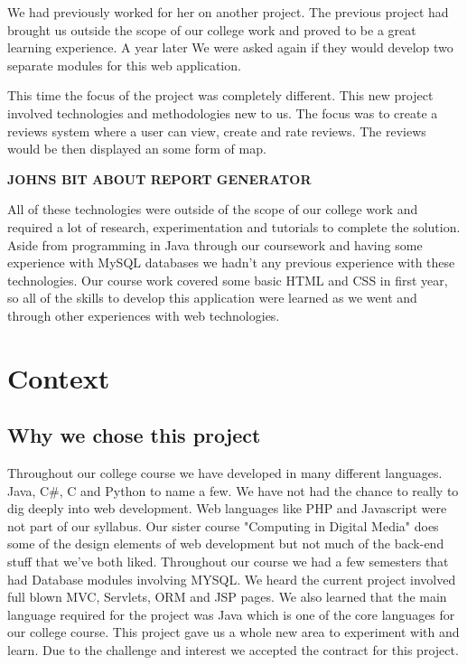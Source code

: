 We had previously worked for her on another project. The previous project had brought us outside the scope of our college work and proved to be a great learning experience. A year later We were asked again if they would develop two separate modules for this web application.

This time the focus of the project was completely different. This new project involved technologies and methodologies new to us. The focus was to create a reviews system where a user can view, create and rate reviews. The reviews would be then displayed an some form of map.\newline

\textbf{JOHNS BIT ABOUT REPORT GENERATOR}\newline

All of these technologies were outside of the scope of our college work and required a lot of research, experimentation and tutorials to complete the solution. Aside from programming in Java through our coursework and having some experience with MySQL databases we hadn't any previous experience with these technologies. Our course work covered some basic HTML and CSS in first year, so all of the skills to develop this application were learned as we went and through other experiences with web technologies.


\chapter{Context}

\section{Why we chose this project}

Throughout our college course we have developed in many different languages. Java, C\#, C and Python to name a few. We have not had the chance to really to dig deeply into web development. Web languages like PHP and Javascript were not part of our syllabus. Our sister course "Computing in Digital Media" does some of the design elements of web development but not much of the back-end stuff that we've both liked. Throughout our course we had a few semesters that had Database modules involving MYSQL. We heard the current project involved full blown MVC, Servlets, ORM and JSP pages. We also learned that the main language required for the project was Java which is one of the core languages for our college course. This project gave us a whole new area to experiment with and learn. Due to the challenge and interest we accepted the contract for this project.

